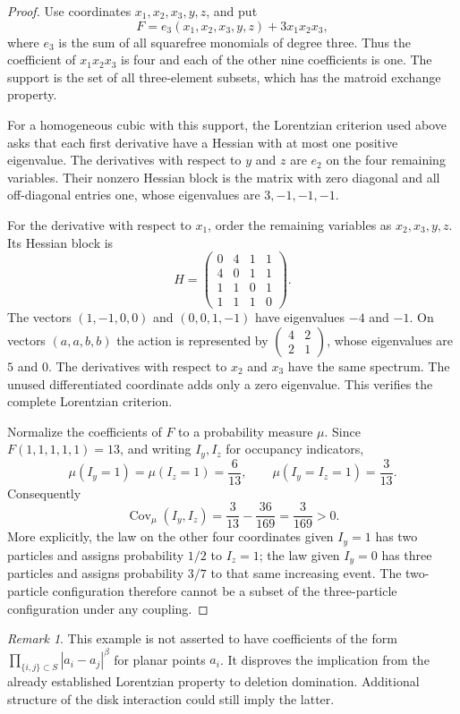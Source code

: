 \documentclass[11pt]{article}
\theoremstyle{remark}\newtheorem{remark}[theorem]{Remark}
\begin{document}
\begin{proof}
Use coordinates $x_1,x_2,x_3,y,z$, and put
\[
 F=e_3(x_1,x_2,x_3,y,z)+3x_1x_2x_3,
\]
where $e_3$ is the sum of all squarefree monomials of degree three.
Thus the coefficient of $x_1x_2x_3$ is four and each of the other nine
coefficients is one.  The support is the set of all three-element
subsets, which has the matroid exchange property.

For a homogeneous cubic with this support, the Lorentzian criterion
used above asks that each first derivative have a Hessian with at most
one positive eigenvalue.  The derivatives with respect to $y$ and $z$
are $e_2$ on the four remaining variables.  Their nonzero Hessian block
is the matrix with zero diagonal and all off-diagonal entries one,
whose eigenvalues are $3,-1,-1,-1$.

For the derivative with respect to $x_1$, order the remaining variables
as $x_2,x_3,y,z$.  Its Hessian block is
\[
 H=\begin{pmatrix}
 0&4&1&1\\
 4&0&1&1\\
 1&1&0&1\\
 1&1&1&0
 \end{pmatrix}.
\]
The vectors $(1,-1,0,0)$ and $(0,0,1,-1)$ have eigenvalues $-4$ and
$-1$.  On vectors $(a,a,b,b)$ the action is represented by
$\left(\begin{smallmatrix}4&2\\2&1\end{smallmatrix}\right)$,
whose eigenvalues are $5$ and $0$.  The derivatives with respect to
$x_2$ and $x_3$ have the same spectrum.  The unused differentiated
coordinate adds only a zero eigenvalue.  This verifies the complete
Lorentzian criterion.

Normalize the coefficients of $F$ to a probability measure $\mu$.
Since $F(1,1,1,1,1)=13$, and writing $I_y,I_z$ for occupancy indicators,
\[
 \mu(I_y=1)=\mu(I_z=1)=\frac6{13},\qquad
 \mu(I_y=I_z=1)=\frac3{13}.
\]
Consequently
\[
 \operatorname{Cov}_{\mu}(I_y,I_z)
 =\frac3{13}-\frac{36}{169}=\frac3{169}>0.
\]
More explicitly, the law on the other four coordinates given $I_y=1$
has two particles and assigns probability $1/2$ to $I_z=1$; the law
given $I_y=0$ has three particles and assigns probability $3/7$ to that
same increasing event.  The two-particle configuration therefore cannot
be a subset of the three-particle configuration under any coupling.
\end{proof}

\begin{remark}
This example is not asserted to have coefficients of the form
$\prod_{\{i,j\}\subset S}|a_i-a_j|^\beta$ for planar points $a_i$.
It disproves the implication from the already established Lorentzian
property to deletion domination.  Additional structure of the disk
interaction could still imply the latter.
\end{remark}
\end{document}
